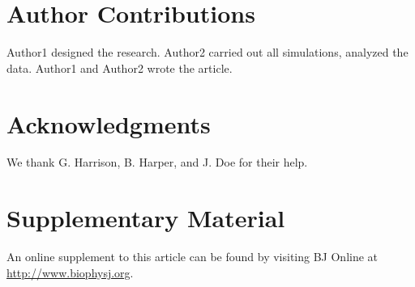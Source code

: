 \documentclass[
  twocolumn]{biophys-new-mod}
\begin{document}
\hypertarget{author-contributions}{%
\section{Author Contributions}\label{author-contributions}}

Author1 designed the research. Author2 carried out all simulations,
analyzed the data. Author1 and Author2 wrote the article.

\hypertarget{acknowledgments}{%
\section{Acknowledgments}\label{acknowledgments}}

We thank G. Harrison, B. Harper, and J. Doe for their help.

\hypertarget{supplementary-material}{%
\section{Supplementary Material}\label{supplementary-material}}

An online supplement to this article can be found by visiting BJ Online
at \url{http://www.biophysj.org}.
\end{document}
